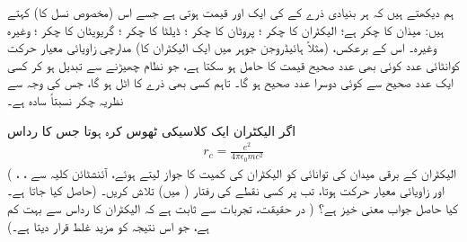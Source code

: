  ہم دیکھتے ہیں کہ ہر بنیادی ذرے کے  کی ایک  اور  قیمت ہوتی ہے جسے اس (مخصوص نسل کا)  کہتے ہیں:  میذان کا چکر  ہے؛ الیکٹران کا چکر ؛ پروٹان کا چکر ؛ ڈیلٹا کا چکر ؛ گریویٹان کا چکر ؛ وغیرہ وغیرہ۔ اس کے برعکس، (مثلاً ہائیڈروجن جوہر میں ایک الیکٹران کا) مدارچی زاویائی معیار حرکت کوانٹائی عدد  کوئی بھی عدد صحیح قیمت کا حامل ہو سکتا ہے، جو نظام چھیڑنے سے تبدیل ہو کر کسی ایک عدد صحیح سے کوئی دوسرا عدد صحیح ہو گا۔ تاہم کسی بھی ذرے کا  اٹل ہو گا، جس کی وجہ سے نظریہ چکر نسبتاً سادہ ہے۔ 

اگر الیکٹران ایک کلاسیکی ٹھوس کرہ ہوتا جس کا رداس 
\begin{align}
r_c = \frac{e^2}{4 \pi \epsilon_0 m c ^2}
\end{align}
( الیکٹران کے برقی میدان کی توانائی کو الیکٹران کی کمیت کا جواز لیتے ہوئے، آئنشٹائن کلیہ  سے ، ، حاصل کیا جاتا ہے۔) اور زاویائی معیار حرکت  ہوتا، تب  پر کسی 
نقطے کی رفتار (  میں) تلاش کریں۔ کیا حاصل جواب معنی خیز ہے؟ ( در حقیقت، تجربات سے ثابت ہے کہ الیکٹران کا رداس  سے بہت کم ہے، جو اس نتیجہ کو مزید غلط قرار دیتا ہے۔) 


